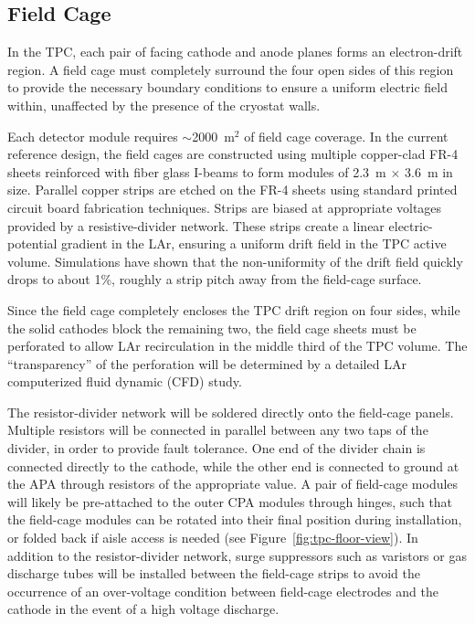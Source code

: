 \subsection{Field Cage}
\label{subsec:fd-ref-fieldcage}

In the TPC, each pair of facing cathode and anode planes forms an
electron-drift region. A field cage must completely surround the four
open sides of this region to provide the necessary boundary conditions
to ensure a uniform electric field within, unaffected by the presence
of the cryostat walls.


Each  detector module requires $\sim$2000~m$^2$ of field
cage coverage. In the current reference design, the field cages are
constructed using multiple copper-clad FR-4 sheets reinforced with
fiber glass I-beams to form modules of 2.3~m $\times$ 3.6~m in
size. Parallel copper strips are etched on the FR-4 sheets using
standard printed circuit board fabrication techniques. Strips are
biased at appropriate voltages provided by a resistive-divider 
network. These strips create a linear electric-potential gradient in
the LAr, ensuring a uniform drift field in the TPC active volume. 
Simulations have shown that the non-uniformity of the drift field quickly
drops to about 1\%, roughly a strip pitch away from the field-cage
surface.

Since the field cage completely encloses the TPC drift region on four
sides, while the solid cathodes block the remaining two, the field
cage sheets must be perforated to allow LAr recirculation in
the middle third of the TPC volume. The ``transparency'' of the
perforation will be determined by a detailed LAr computerized fluid
dynamic (CFD) study.

The resistor-divider network will be soldered directly onto the
field-cage panels. Multiple resistors will be connected in parallel
between any two taps of the divider, in order to provide fault
tolerance. 
One end of the divider chain is connected directly to the
cathode, while the other end is connected to ground at the APA through
resistors of the appropriate value.  %
A pair of
field-cage modules will likely be %
pre-attached to the outer CPA modules through
hinges, %
such that the field-cage modules can be rotated into their final
position during installation, or folded back if aisle access is needed
(see Figure~\ref{fig:tpc-floor-view}).  In addition to the resistor-divider
network, surge suppressors such as varistors or gas discharge tubes
will be installed between the field-cage strips to avoid the occurrence of an
over-voltage condition between field-cage electrodes and the
cathode in the event of a high voltage discharge.

